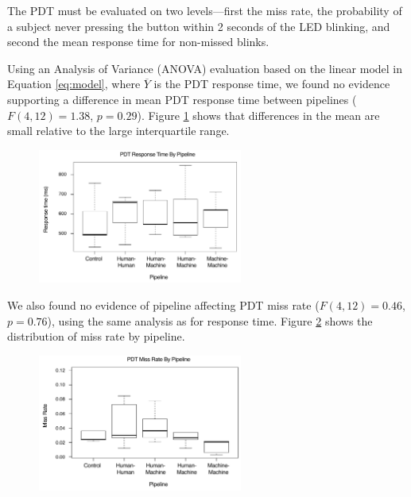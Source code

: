 The PDT must be evaluated on two levels---first the miss rate, the probability of a subject never pressing the button within 2 seconds of the LED blinking, and second the mean response time for non-missed blinks.

Using an Analysis of Variance (ANOVA) evaluation based on the linear model in Equation \ref{eq:model}, where $\overline{Y}$ is the PDT response time, we found no evidence supporting a difference in mean PDT response time between pipelines ($F(4, 12) = 1.38$, $p=0.29$). Figure \ref{fig:plot:responsetime} shows that differences in the mean are small relative to the large interquartile range.

\begin{figure}[htbp]
  \centering
  \includegraphics[width=0.6\textwidth]{images/plot_responsetime.pdf}
  \caption{}
  \label{fig:plot:responsetime}
\end{figure}

We also found no evidence of pipeline affecting PDT miss rate ($F(4, 12) = 0.46$, $p=0.76$), using the same analysis as for response time. Figure \ref{fig:plot:missrate}  shows the distribution of miss rate by pipeline.

\begin{figure}[htbp]
  \centering
  \includegraphics[width=0.6\textwidth]{images/plot_misses.pdf}
  \caption{}
  \label{fig:plot:missrate}
\end{figure}

